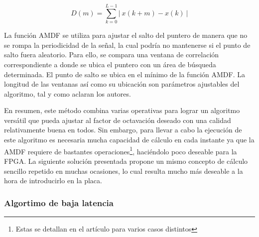 \begin{equation}
\label{eq:amdf}
D(m) =  \sum_{k = 0}^{L - 1}|~x(k+m)-x(k)~|
\end{equation}

La función AMDF se utiliza para ajustar el salto del puntero de manera que no se rompa la periodicidad de la señal, la cual podría no mantenerse si el punto de salto fuera aleatorio. Para ello, se compara una ventana de correlación correspondiente a donde se ubica el puntero con un área de búsqueda determinada. El punto de salto se ubica en el mínimo de la función AMDF. La longitud de las ventanas así como su ubicación son parámetros ajustables del algoritmo, tal y como aclaran los autores.

En resumen, este método combina varias operativas para lograr un algoritmo versátil que pueda ajustar al factor de octavación deseado con una calidad relativamente buena en todos. Sin embargo, para llevar a cabo la ejecución de este algoritmo es necesaria mucha capacidad de cálculo en cada instante ya que la AMDF requiere de bastantes operaciones\footnote{Estas se detallan en el artículo \cite{nfctsm} para varios casos distintos}, haciéndolo poco deseable para la FPGA. La siguiente solución presentada propone un mismo concepto de cálculo sencillo repetido en muchas ocasiones, lo cual resulta mucho más deseable a la hora de introducirlo en la placa.

\subsubsection{Algortimo de baja latencia}
\label{rhilbert}

